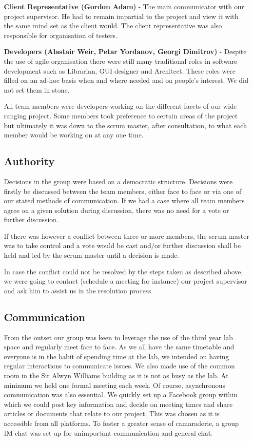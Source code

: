 \documentclass{l3proj}
\begin{document}
{\bf Client Representative (Gordon Adam)} - The main communicator with our project supervisor. He had to remain impartial to the project and view it with the same mind set as the client would. The client representative was also responsible for organisation of testers.

{\bf Developers (Alastair Weir, Petar Yordanov, Georgi Dimitrov)} - Despite the use of agile organisation there were still many traditional roles in software development such as Librarian, GUI designer and Architect.  These roles were filled on an ad-hoc basis when and where needed and on people’s interest. We did not set them in stone.

All team members were developers working on the different facets of our wide ranging project. Some members took preference to certain areas of the project but ultimately it was down to the scrum master, after consultation, to what each member would be working on at any one time.

\subsection{Authority}Decisions in the group were based on a democratic structure. Decisions were firstly be discussed between the team members, either face to face or via one of our stated methods of communication. If we had a case where all team members agree on a given solution during discussion, there was no need for a vote or further discussion.

If there was however a conflict between three or more members, the scrum master was to take control and a vote would be cast and/or further discussion shall be held and led by the scrum master until a decision is made.

In case the conflict could not be resolved by the steps taken as described above, we were going to contact (schedule a meeting for instance) our project supervisor and ask him to assist us in the resolution process.

\subsection{Communication}From the outset our group was keen to leverage the use of the third year lab space and regularly meet face to face. As we all have the same timetable and everyone is in the habit of spending time at the lab, we intended on having regular interactions to communicate issues. We also made use of the common room in the Sir Alwyn Williams building as it is not as busy as the lab. At minimum we held one formal meeting each week. Of course, asynchronous communication was also essential. We quickly set up a Facebook group within which we could post key information and decide on meeting times and share articles or documents that relate to our project. This was chosen as it is accessible from all platforms. To foster a greater sense of camaraderie, a group IM chat was set up for unimportant communication and general chat.
\end{document}
